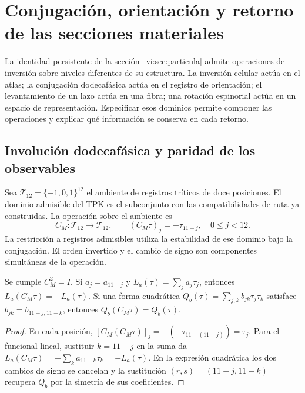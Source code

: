 \section{Conjugación, orientación y retorno de las secciones materiales}
\label{vi:sec:conjugacion}

La identidad persistente de la sección~\ref{vi:sec:particula} admite
operaciones de inversión sobre niveles diferentes de su estructura.
La inversión celular actúa en el atlas; la conjugación dodecafásica
actúa en el registro de orientación; el levantamiento de un lazo actúa
en una fibra; una rotación espinorial actúa en un espacio de
representación. Especificar esos dominios permite componer las
operaciones y explicar qué información se conserva en cada retorno.

\subsection{Involución dodecafásica y paridad de los observables}
\label{vi:subsec:conjugacion-registro}

Sea $\mathcal T_{12}=\{-1,0,1\}^{12}$ el ambiente de registros
tríticos de doce posiciones. El dominio admisible del TPK es el
subconjunto con las compatibilidades de ruta ya construidas. La
operación sobre el ambiente es
\begin{equation}
 C_M:\mathcal T_{12}\longrightarrow\mathcal T_{12},\qquad
 (C_M\tau)_j=-\tau_{11-j},\quad 0\leq j<12.
 \label{vi:eq:cm}
\end{equation}
La restricción a registros admisibles utiliza la estabilidad de ese
dominio bajo la conjugación. El orden invertido y el cambio de signo
son componentes simultáneas de la operación.

\begin{proposition}
\label{vi:prop:paridad-registro}
Se cumple $C_M^2=I$. Si $a_j=a_{11-j}$ y
$L_a(\tau)=\sum_ja_j\tau_j$, entonces
$L_a(C_M\tau)=-L_a(\tau)$. Si una forma cuadrática
$Q_b(\tau)=\sum_{j,k}b_{jk}\tau_j\tau_k$ satisface
$b_{jk}=b_{11-j,11-k}$, entonces $Q_b(C_M\tau)=Q_b(\tau)$.
\end{proposition}
\begin{proof}
En cada posición,
$[C_M(C_M\tau)]_j=-(-\tau_{11-(11-j)})=\tau_j$.
Para el funcional lineal, sustituir $k=11-j$ en la suma da
$L_a(C_M\tau)=-\sum_ka_{11-k}\tau_k=-L_a(\tau)$.
En la expresión cuadrática los dos cambios de signo se cancelan y
la sustitución $(r,s)=(11-j,11-k)$ recupera $Q_b$ por la
simetría de sus coeficientes.
\end{proof}

